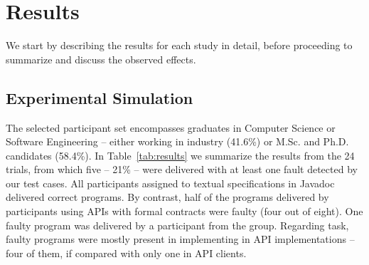 \section{Results}
\label{sec:results}

We start by describing the results for each study in detail, before proceeding to summarize and discuss the observed effects.

\subsection{Experimental Simulation}
\label{sec:expResults}

The selected participant set encompasses graduates in Computer Science or Software Engineering -- either working in industry (41.6\%) or M.Sc. and Ph.D. candidates (58.4\%).
In Table~\ref{tab:results} we summarize the results from the 24 trials, from which five -- 21\% -- were delivered with at least one fault detected by our test cases.
All participants assigned to textual specifications in Javadoc delivered correct programs.
By contrast, half of the programs delivered by participants using APIs with formal contracts were faulty (four out of eight).
One faulty program was delivered by a participant from the \contractjdoc{} group.
Regarding task, faulty programs were mostly present in implementing in API implementations -- four of them, if compared with only one in API clients.





